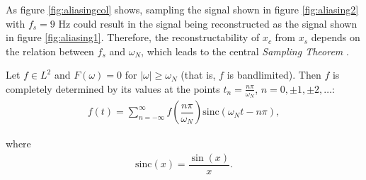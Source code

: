As figure \ref{fig:aliasingcol} shows, sampling the signal shown in figure \ref{fig:aliasing2} with $f_s = 9$ Hz could result in the signal being reconstructed as the signal shown in figure \ref{fig:aliasing1}. Therefore, the reconstructability of $x_c$ from $x_s$ depends on the relation between $f_s$ and $\omega_N$, which leads to the central \textit{Sampling Theorem} \cite{page 230, FAA}.

\begin{theorem} \label{sampling_theorem}
Let $f \in L^2$ and $F(\omega) = 0$ for $|\omega| \geq \omega_N$ (that is, $f$ is bandlimited). Then $f$ is completely determined by its values at the points $t_n = \frac{n \pi}{\omega_N}$, $n=0,\pm 1,\pm 2,\ldots$:
\begin{align*}
f(t) = \sum_{n=-\infty}^{\infty} f \left( \dfrac{n\pi}{\omega_N} \right) \mathrm{sinc}(\omega_N t - n\pi),
\end{align*}

where
\begin{align}
\mathrm{sinc}(x) = \dfrac{\sin(x)}{x}.
\end{align}
\end{theorem}

